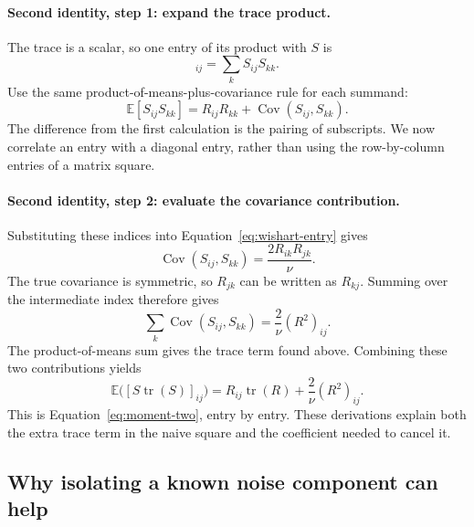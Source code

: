 \documentclass[11pt]{article}
\newcommand{\E}{\mathbb{E}}
\newcommand{\cov}{\operatorname{Cov}}
\begin{document}
\paragraph{Second identity, step 1: expand the trace product.}
The trace is a scalar, so one entry of its product with $S$ is
\begin{equation}
 [S\operatorname{tr}(S)]_{ij}=\sum_k S_{ij}S_{kk}.
\end{equation}
Use the same product-of-means-plus-covariance rule for each summand:
\begin{equation}
 \E[S_{ij}S_{kk}]=R_{ij}R_{kk}+\cov(S_{ij},S_{kk}).
\end{equation}
The difference from the first calculation is the pairing of subscripts.
We now correlate an entry with a diagonal entry, rather than using the
row-by-column entries of a matrix square.

\paragraph{Second identity, step 2: evaluate the covariance contribution.}
Substituting these indices into Equation~\eqref{eq:wishart-entry} gives
\begin{equation}
 \cov(S_{ij},S_{kk})=\frac{2R_{ik}R_{jk}}{\nu}.
\end{equation}
The true covariance is symmetric, so $R_{jk}$ can be written as $R_{kj}$.
Summing over the intermediate index therefore gives
\begin{equation}
 \sum_k\cov(S_{ij},S_{kk})=\frac2\nu(R^2)_{ij}.
\end{equation}
The product-of-means sum gives the trace term found above. Combining
these two contributions yields
\begin{equation}
 \E\bigl([S\operatorname{tr}(S)]_{ij}\bigr)
       =R_{ij}\operatorname{tr}(R)+\frac2\nu(R^2)_{ij}.
\end{equation}
This is Equation~\eqref{eq:moment-two}, entry by entry. These derivations
explain both the extra trace term in the naive square and the coefficient
needed to cancel it.

\subsection{Why isolating a known noise component can help}
\end{document}

